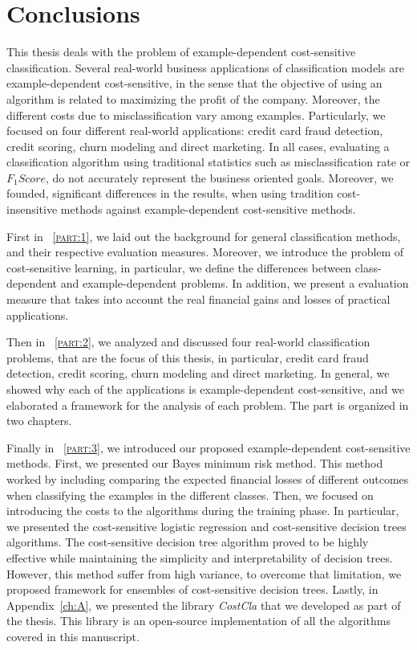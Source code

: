 \chapter{Conclusions}\label{ch:10}

This thesis deals with the problem of example-dependent cost-sensitive classification.
Several real-world business applications of classification models are example-dependent 
cost-sensitive, in the sense that the objective of using an algorithm is related to maximizing the 
profit of the company. Moreover, the different costs due to misclassification vary among examples. 
Particularly, we focused on four different real-world applications: credit card fraud 
detection, credit scoring, churn modeling and direct marketing. In all cases, evaluating a 
classification algorithm using traditional statistics such as misclassification rate or $F_1Score$, 
do not accurately represent the business oriented goals. Moreover, we founded, significant 
differences in the results, when using tradition cost-insensitive methods against example-dependent 
cost-sensitive methods.

First in \partname{~\textsc{\ref{part:1}}}, we laid out the background for general classification 
methods, and their respective evaluation measures. Moreover, we introduce the problem of 
cost-sensitive learning, in particular, we define the differences between class-dependent and 
example-dependent problems. In addition, we present a evaluation measure that takes into account 
the real financial gains and losses of practical applications.

Then in \partname{~\textsc{\ref{part:2}}}, we analyzed and discussed four real-world 
classification problems, that are the focus of this thesis, in particular, credit card fraud 
detection, credit scoring, churn modeling and direct marketing. In general, we showed why each of 
the applications is example-dependent cost-sensitive, and we elaborated a framework for the 
analysis of each problem. The part is organized in two chapters.

Finally in \partname{~\textsc{\ref{part:3}}}, we introduced our proposed example-dependent 
cost-sensitive methods. First, we presented our Bayes minimum risk method. This method worked by 
including comparing the expected financial losses of different outcomes when classifying the 
examples in the different classes. Then, we focused on introducing the costs to the algorithms 
during the training phase. In particular, we presented the cost-sensitive logistic regression and  
cost-sensitive decision trees algorithms. The cost-sensitive decision tree algorithm proved to be 
highly effective while maintaining the simplicity and interpretability of decision trees. However, 
this method suffer from high variance, to overcome that limitation, we proposed framework for 
ensembles of cost-sensitive decision trees. Lastly, in Appendix~\ref{ch:A}, we presented the 
library \mbox{\textit{CostCla}} that we developed as part of the thesis. This library is an 
open-source implementation of all the algorithms covered in this manuscript. 

